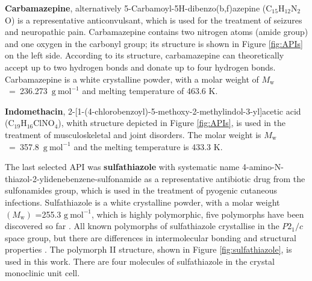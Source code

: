 \newpage
\textbf{Carbamazepine}, alternatively 5-Carbamoyl-5H-dibenzo(b,f)azepine (C$_{15}$H$_{12}$N$_{2}$O) is a representative anticonvulsant, which is used for the treatment of seizures and neuropathic pain. Carbamazepine contains two nitrogen atoms (amide group) and one oxygen in the carbonyl group; its structure is shown in Figure \ref{fig:APIs} on the left side. According to its structure, carbamazepine can theoretically accept up to two hydrogen bonds and donate up to four hydrogen bonds. Carbamazepine is a white crystalline powder, with a molar weight of $M_\mathrm{w}$~=~236.273~$\mathrm{g\ mol^{-1}}$ and melting temperature of 463.6 K. \cite{stejfa_heat_2021}

\textbf{Indomethacin}, \hspace{0.1cm} 2-[1-(4-chlorobenzoyl)-5-methoxy-2-methylindol-3-yl]acetic \hspace{0.2cm}acid\\ (C$_{19}$H$_{16}$ClNO$_{4}$), whith structure depicted in Figure \ref{fig:APIs}, is used in the treatment of musculoskeletal and joint disorders. The molar weight is $M_\mathrm{w}$~=~357.8~$\mathrm{g\ mol^{-1}}$ and the melting temperature is 433.3 K. \cite{stejfa_heat_2021}



The last selected API was \textbf{sulfathiazole} with systematic name 4-amino-N-thiazol-2-ylidenebenzene-sulfonamide as a representative antibiotic drug from the sulfonamides group, which is used in the treatment of pyogenic cutaneous infections. Sulfathiazole is a white crystalline powder, with a molar weight $(M_\mathrm{w})$ =255.3 $\mathrm{g\ mol^{-1}}$, which is highly polymorphic, five polymorphs have been discovered so far \cite{caron_comparison_2011}. All known polymorphs of sulfathiazole crystallise in the $P2_1/c$ space group, but there are differences in intermolecular bonding and structural properties \cite{drebushchak_crystal_2008}. The polymorph II structure, shown in Figure \ref{fig:sulfathiazole}, is used in this work. There are four molecules of sulfathiazole in the crystal monoclinic unit cell. 

